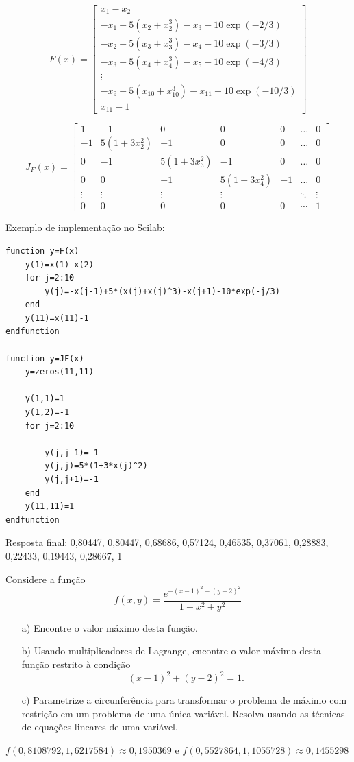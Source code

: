 \begin{resp}
$$F\left(x\right)=\left[
\begin{array}{c}
x_1-x_2\\[.2cm]
-x_{1}+5(x_2+x_2^3)-x_{3}-10\exp(-2/3)\\[.2cm]
-x_{2}+5(x_3+x_3^3)-x_{4}-10\exp(-3/3)\\[.2cm]
-x_{3}+5(x_4+x_4^3)-x_{5}-10\exp(-4/3)\\[.2cm]
\vdots\\
-x_{9}+5(x_{10}+x_{10}^3)-x_{11}-10\exp(-10/3)\\[.2cm]
x_{11}-1
\end{array}\right] $$

$$J_F(x)=\left[
\begin{array}{ccccccc}
1& -1 &0 &0 &0&\ldots & 0\\[.2cm]
-1&5(1+3x_2^2)& -1&0&0&\ldots & 0\\[.2cm]
0&-1&5(1+3x_3^2)& -1&0&\ldots & 0\\[.2cm]
0&0&-1&5(1+3x_4^2)& -1&\ldots & 0\\[.2cm]
\vdots &\vdots &\vdots &\vdots &&\ddots&\vdots\\[.2cm]
0&0&0&0&0&\cdots&1
\end{array}
\right]
$$

\ifisscilab
Exemplo de implementação no Scilab:
\begin{verbatim}
function y=F(x)
    y(1)=x(1)-x(2)
    for j=2:10
        y(j)=-x(j-1)+5*(x(j)+x(j)^3)-x(j+1)-10*exp(-j/3)
    end
    y(11)=x(11)-1
endfunction

function y=JF(x)
    y=zeros(11,11)

    y(1,1)=1
    y(1,2)=-1
    for j=2:10

        y(j,j-1)=-1
        y(j,j)=5*(1+3*x(j)^2)
        y(j,j+1)=-1
    end
    y(11,11)=1
endfunction
\end{verbatim}
\fi

Resposta final: 0,80447, 0,80447, 0,68686, 0,57124, 0,46535,
0,37061, 0,28883, 0,22433, 0,19443, 0,28667,  1
\end{resp}


\begin{exer} Considere a função
$$f(x,y)=\frac{e^{-(x-1)^2-(y-2)^2}}{1+x^2+y^2}$$
\begin{itemize}
\item[a)] Encontre o valor máximo desta função.
\item[b)] Usando multiplicadores de Lagrange, encontre o valor máximo desta função restrito à condição $$(x-1)^2+(y-2)^2=1.$$
\item[c)] Parametrize a circunferência para transformar o problema de máximo com restrição em um problema de uma única variável. Resolva usando as técnicas de equações lineares de uma variável.
\end{itemize}
\end{exer}
\begin{resp}
$f(0,8108792, 1,6217584)\approx 0,1950369$ e $f(0,5527864, 1,1055728 )\approx 0,1455298 $
\end{resp}

